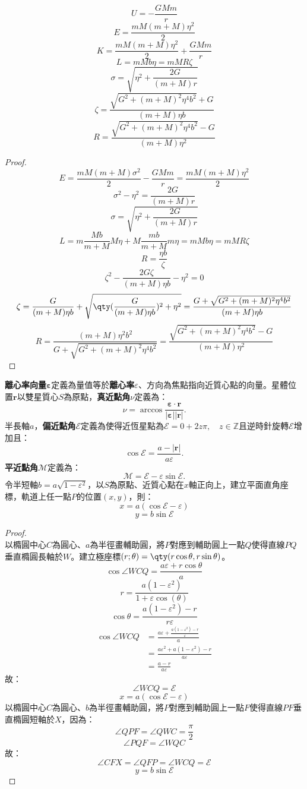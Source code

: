 \documentclass[a4paper,12pt]{article}
\begin{document}
\[U=-\frac{GMm}{r}\]
\[E=\frac{mM(m+M)\eta^2}{2}\]
\[K=\frac{mM(m+M)\eta^2}{2}+\frac{GMm}{r}\]
\[L=mMb\eta=mMR\zeta\]
\[\sigma=\sqrt{\eta^2+\frac{2G}{(m+M)r}}\]
\[\zeta=\frac{\sqrt{G^2+(m+M)^2\eta^4b^2}+G}{(m+M)\eta b}\]
\[R=\frac{\sqrt{G^2+(m+M)^2\eta^4b^2}-G}{(m+M)\eta^2}\]
\begin{proof}
\[E=\frac{mM(m+M)\sigma^2}{2}-\frac{GMm}{r}=\frac{mM(m+M)\eta^2}{2}\]
\[\sigma^2-\eta^2=\frac{2G}{(m+M)r}\]
\[\sigma=\sqrt{\eta^2+\frac{2G}{(m+M)r}}\]
\[L=m\frac{Mb}{m+M}M\eta+M\frac{mb}{m+M}m\eta=mMb\eta=mMR\zeta\]
\[R=\frac{\eta b}{\zeta}\]
\[\zeta^2-\frac{2G\zeta}{(m+M)\eta b}-\eta^2=0\]
\[\zeta=\frac{G}{(m+M)\eta b}+\sqrt{\qty(\frac{G}{(m+M)\eta b})^2+\eta^2}=\frac{G+\sqrt{G^2+(m+M)^2\eta^4b^2}}{(m+M)\eta b}\]
\[R=\frac{(m+M)\eta^2b^2}{G+\sqrt{G^2+(m+M)^2\eta^4b^2}}=\frac{\sqrt{G^2+(m+M)^2\eta^4b^2}-G}{(m+M)\eta^2}\]
\end{proof}
\textbf{離心率向量}$\boldsymbol{\varepsilon}$定義為量值等於\textbf{離心率}$\varepsilon$、方向為焦點指向近質心點的向量。星體位置$\mathbf{r}$以雙星質心$S$為原點，\textbf{真近點角}$\nu$定義為：
\[\nu=\arccos\frac{\boldsymbol{\varepsilon}\cdot\mathbf{r}}{|\boldsymbol{\varepsilon}||\mathbf{r}|}.\]
半長軸$a$，\textbf{偏近點角}$\mathscr{E}$定義為使得近恆星點為$\mathscr{E}=0+2z\pi,\quad z\in\mathbb{Z}$且逆時針旋轉$\mathscr{E}$增加且：
\[\cos\mathscr{E}=\frac{a-|\mathbf{r}|}{a\varepsilon}.\]
\textbf{平近點角}$\mathscr{M}$定義為：
\[\mathscr{M}=\mathscr{E}-\varepsilon\sin\mathscr{E}.\]
令半短軸$b=a\sqrt{1-\varepsilon^2}$，以$S$為原點、近質心點在$x$軸正向上，建立平面直角座標，軌道上任一點$P$的位置$(x,y)$，則：
\[x=a(\cos\mathscr{E}-\varepsilon)\]
\[y=b\sin\mathscr{E}\]
\begin{proof}\mbox{}\\
以橢圓中心$C$為圓心、$a$為半徑畫輔助圓，將$P$對應到輔助圓上一點$Q$使得直線$PQ$垂直橢圓長軸於$W$。建立極座標$(r;\theta)=\qty(r\cos\theta,r\sin\theta)$。
\[\cos\angle WCQ=\frac{a\varepsilon+r\cos\theta}{a}\]
\[r=\frac{a(1-\varepsilon^2)}{1+\varepsilon\cos(\theta)}\]
\[\cos\theta=\frac{a(1-\varepsilon^2)-r}{r\varepsilon}\]
\[\begin{aligned}
\cos\angle WCQ&=\frac{a\varepsilon+\frac{a(1-\varepsilon^2)-r}{\varepsilon}}{a}\\
&=\frac{a\varepsilon^2+a(1-\varepsilon^2)-r}{a\varepsilon}\\
&=\frac{a-r}{a\varepsilon}
\end{aligned}\]
故：
\[\angle WCQ=\mathscr{E}\]
\[x=a(\cos\mathscr{E}-\varepsilon)\]
以橢圓中心$C$為圓心、$b$為半徑畫輔助圓，將$P$對應到輔助圓上一點$F$使得直線$PF$垂直橢圓短軸於$X$，因為：
\[\angle QPF=\angle QWC=\frac{\pi}{2}\]
\[\angle PQF=\angle WQC\]
故：
\[\angle CFX=\angle QFP=\angle WCQ=\mathscr{E}\]
\[y=b\sin\mathscr{E}\]
\end{proof}
\end{document}
